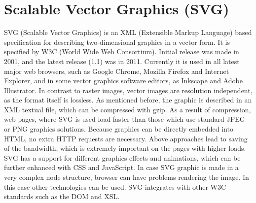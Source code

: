 %
%
% 
% 
% 


\section{Scalable Vector Graphics (SVG)}
\label{sect:SVG}
SVG (Scalable Vector Graphics) is an XML (Extensible Markup Language) based specification for describing two-dimensional graphics in a vector form. It is specified by W3C (World Wide Web Consortium). Initial release was made in 2001, and the latest release (1.1) was in 2011. Currently it is used in all latest major web browsers, such as Google Chrome, Mozilla Firefox and Internet Explorer, and in some vector graphics software editors, as Inkscape and Adobe Illustrator. In contrast to raster images, vector images are resolution independent, as the format itself is lossless. As mentioned before, the graphic is described in an XML textual file, which can be compressed with gzip. As a result of compression, web pages, where SVG is used load faster than those which use standard JPEG or PNG graphics solutions. Because graphics can be directly embedded into HTML, no extra HTTP requests are necessary. Above approaches lead to saving of the bandwidth, which is extremely important on the pages with higher loads. SVG has a support for different graphics effects and animations, which can be further enhanced with CSS and JavaScript. In case SVG graphic is made in a very complex node structure, browser can have problems rendering the image. In this case other technologies can be used. SVG integrates with other W3C standards such as the DOM and XSL\citep{w3schoolSVG}. 

